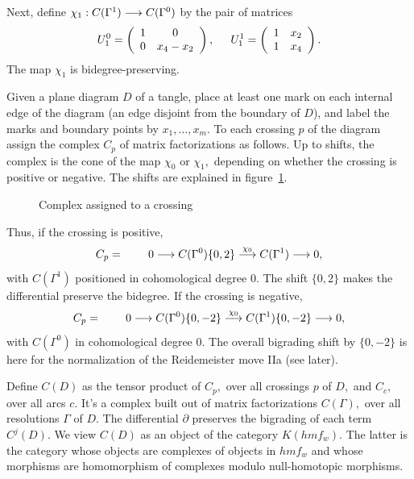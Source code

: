 \documentclass[12pt]{article}
\begin{document}
Next, define $\chi_1: C(\Gamma^1) \longrightarrow C(\Gamma^0)$
by the pair of matrices 
\begin{equation}\label{chione} 
U_1^0=\left(\begin{array}{cc} 1  &  0  \\
      0   &  x_4-x_2  \end{array} \right), \hspace{0.2in}
U_1^1=\left(\begin{array}{cc} 1  &  x_2 \\
      1  & x_4 \end{array} \right). 
\end{equation}
The map $\chi_1$ is bidegree-preserving. 

\vspace{0.1in} 

Given a plane diagram $D$ of a tangle, place at least one mark on each 
internal edge of the diagram (an edge disjoint from the boundary of $D$), 
and label the marks and boundary points by $x_1, \dots, x_m.$ 
To each crossing $p$ of the diagram assign the 
 complex $C_p$ of matrix factorizations as follows. Up to shifts, 
the complex is the cone of the map $\chi_0$ or $\chi_1,$ depending 
on whether the crossing is 
positive or negative. The shifts are explained in figure~\ref{cones}. 

 \begin{figure} \caption{Complex assigned
 to a crossing} \label{cones}
 \end{figure}
Thus, if the crossing is positive, 
$$C_p = \hspace{0.3in} 0 \longrightarrow C(\Gamma^0)\{0,2\} \stackrel{\chi_0}{\longrightarrow} 
 C(\Gamma^1) \longrightarrow 0 ,$$ 
with $C(\Gamma^1)$ positioned in cohomological degree $0.$ The shift $\{0,2\}$ 
makes the differential preserve the bidegree. 
 If the crossing is negative, 
$$ C_p = \hspace{0.3in} 0 \longrightarrow C(\Gamma^0)\{0,-2\} \stackrel{\chi_0}{\longrightarrow} 
 C(\Gamma^1)\{0,-2\} \longrightarrow 0 ,$$ 
with $C(\Gamma^0)$ in cohomological degree $0.$ The overall bigrading 
shift by $\{0,-2\}$ is here for the normalization of the Reidemeister 
move IIa (see later). 

Define $C(D)$ as the tensor product of $C_p,$ over all crossings $p$ of $D,$ 
and $C_c,$ over all arcs $c.$ It's a complex built out of matrix 
factorizations $C(\Gamma),$ over all resolutions $\Gamma$ of $D.$ 
The differential $\partial$ preserves the bigrading of each 
term $C^j(D).$ We view $C(D)$ as an object of the category $K(hmf_w).$  
The latter is the category whose objects are complexes of objects 
in $hmf_w$ and whose morphisms are homomorphism of complexes modulo null-homotopic 
morphisms.  
\end{document}
